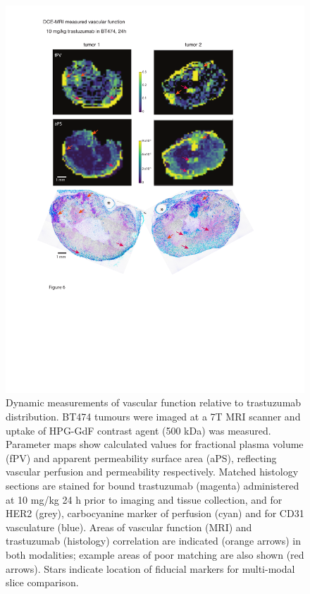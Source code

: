 \begin{figure}[htbp] %
  \centering
  \includegraphics[width=\textwidth]{hpg/hpg-paper2-images/Fig6.pdf} 
  \caption{Dynamic measurements of vascular function relative to trastuzumab distribution. BT474 tumours were imaged at a 7T MRI scanner and uptake of \ac{HPG-GdF} contrast agent (500 kDa) was measured. 
  Parameter maps show calculated values for fractional plasma volume (fPV) and apparent permeability surface area (aPS), reflecting vascular perfusion and permeability respectively. 
  Matched histology sections are stained for bound trastuzumab (magenta) administered at 10 mg/kg 24 h prior to imaging and tissue collection, and for HER2 (grey), carbocyanine marker of perfusion (cyan) and for CD31 vasculature (blue). 
  Areas of vascular function (MRI) and trastuzumab (histology) correlation are indicated (orange arrows) in both modalities; example areas of poor matching are also shown (red arrows). 
  Stars indicate location of fiducial markers for multi-modal slice comparison.}
  \label{hpgpaper2:fig6}
\end{figure}

